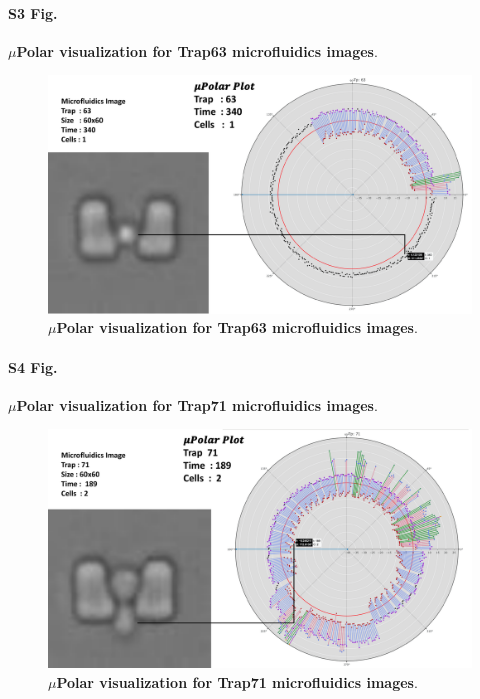 \documentclass[conference]{IEEEtran}
\begin{document}
\paragraph*{S3 Fig.}
\label{S3_Fig}
{\bf $\mu$Polar visualization for Trap63 microfluidics images}. 

\begin{figure}
\centering
\includegraphics[width=\textwidth,height=10 cm]{Patterns/bc8tp63.pdf}
\caption{ \textbf{$\mu$Polar visualization for Trap63 microfluidics images}.}
\label{S3_Fig}
\end{figure}


\paragraph*{S4 Fig.}
\label{S4_Fig}
{\bf  $\mu$Polar visualization for Trap71 microfluidics images}. 

\begin{figure}
\centering
\includegraphics[width=\textwidth,height=10 cm]{Patterns/bc8tp71.pdf}
\caption{  \textbf{$\mu$Polar visualization for Trap71 microfluidics images}.}
\label{S4_Fig}
\end{figure}
\end{document}

